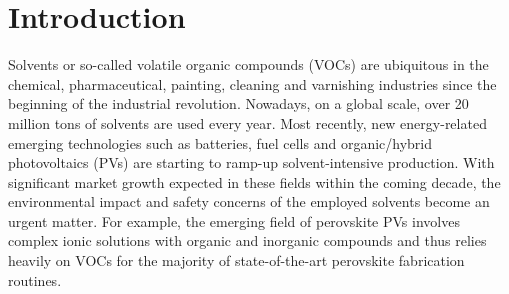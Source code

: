 \documentclass[
  english,        %
  font=times,     %
  onecolumn,      %
]{article}
\begin{document}
\begin{abstract}
\end{abstract}

\section{Introduction}

Solvents or so-called volatile organic compounds (VOCs) are ubiquitous in the chemical, pharmaceutical, painting, cleaning and varnishing industries since the beginning of the industrial revolution\cite{calvo-floresGreenBioBasedSolvents2018}. Nowadays, on a global scale, over 20 million tons of solvents are used every year\cite{wintertonGreenSolventCritical2021}. Most recently, new energy-related emerging technologies such as batteries\cite{clementRecentAdvancesPrinted2022}, fuel cells\cite{choolaeiRecentAdvancesChallenges2023} and organic/hybrid photovoltaics (PVs)\cite{howardCoatedPrintedPerovskites2019} are starting to ramp-up solvent-intensive production. With significant market growth expected in these fields within the coming decade\cite{ThinFilmMateriala}, the environmental impact and safety concerns of the employed solvents become an urgent matter\cite{davidVolatileOrganicCompounds2021,pandeyReviewVolatileOrganic2018,pongboonkhumlarpHealthRiskAnalysis2022}. For example, the emerging field of perovskite PVs involves complex ionic solutions with organic and inorganic compounds and thus relies heavily on VOCs for the majority of state-of-the-art perovskite fabrication routines\cite{podapangiGreenSolventsMaterials2023,leeGreenSolventStrategies2025}.
\end{document}

